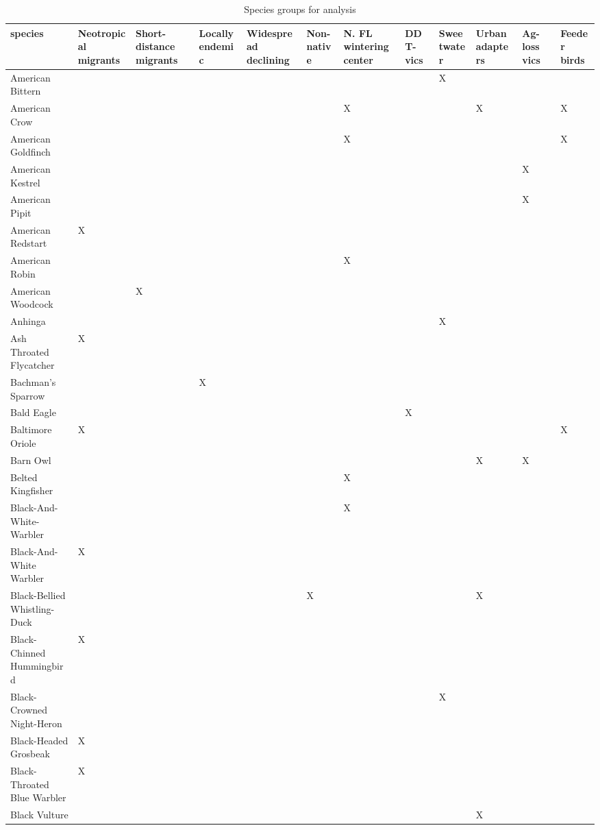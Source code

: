 \documentclass[]{article}
\begin{document}
\begin{longtable}{llllllllllll}
\caption{\label{tab:sppGroupTab}Species groups for analysis}\\
\toprule
species & Neotropical migrants & Short-distance migrants & Locally endemic & Widespread declining & Non-native & N. FL wintering center & DDT-vics & Sweetwater & Urban adapters & Ag-loss vics & Feeder birds\\
\midrule
American Bittern &  &  &  &  &  &  &  & X &  &  & \\
American Crow &  &  &  &  &  & X &  &  & X &  & X\\
American Goldfinch &  &  &  &  &  & X &  &  &  &  & X\\
American Kestrel &  &  &  &  &  &  &  &  &  & X & \\
American Pipit &  &  &  &  &  &  &  &  &  & X & \\
\addlinespace
American Redstart & X &  &  &  &  &  &  &  &  &  & \\
American Robin &  &  &  &  &  & X &  &  &  &  & \\
American Woodcock &  & X &  &  &  &  &  &  &  &  & \\
Anhinga &  &  &  &  &  &  &  & X &  &  & \\
Ash Throated Flycatcher & X &  &  &  &  &  &  &  &  &  & \\
\addlinespace
Bachman's Sparrow &  &  & X &  &  &  &  &  &  &  & \\
Bald Eagle &  &  &  &  &  &  & X &  &  &  & \\
Baltimore Oriole & X &  &  &  &  &  &  &  &  &  & X\\
Barn Owl &  &  &  &  &  &  &  &  & X & X & \\
Belted Kingfisher &  &  &  &  &  & X &  &  &  &  & \\
\addlinespace
Black-And-White-Warbler &  &  &  &  &  & X &  &  &  &  & \\
Black-And-White Warbler & X &  &  &  &  &  &  &  &  &  & \\
Black-Bellied Whistling-Duck &  &  &  &  & X &  &  &  & X &  & \\
Black-Chinned Hummingbird & X &  &  &  &  &  &  &  &  &  & \\
Black-Crowned Night-Heron &  &  &  &  &  &  &  & X &  &  & \\
\addlinespace
Black-Headed Grosbeak & X &  &  &  &  &  &  &  &  &  & \\
Black-Throated Blue Warbler & X &  &  &  &  &  &  &  &  &  & \\
Black Vulture &  &  &  &  &  &  &  &  & X &  & \\

\end{longtable}
\end{document}
